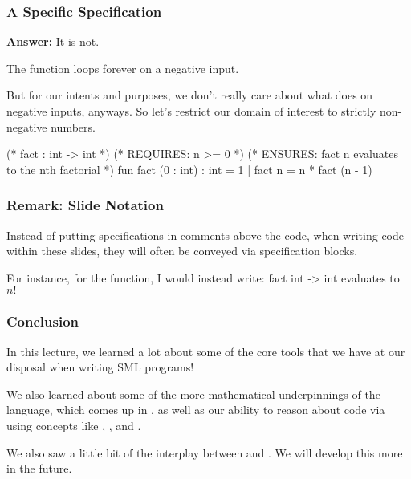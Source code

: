 \documentclass[aspectratio=169, handout]{beamer}
\begin{document}
\begin{frame}[fragile]
  \frametitle{A Specific Specification}

  \textbf{Answer:} It is not.

  \pause
  \vspace{\fill}

  The  function loops forever on a negative input.

  \pause
  \vspace{\fill}

  But for our intents and purposes, we don't really
  care about what  does on negative inputs, anyways. So
  let's restrict our domain of interest to strictly non-negative
  numbers.

  \pause
  \vspace{\fill}

  \begin{codeblock}
    (* fact : int -> int *)
    (* REQUIRES: n >= 0 *)
    (* ENSURES: fact n evaluates to the nth factorial *)
    fun fact (0 : int) : int = 1
      | fact n = n * fact (n - 1)
  \end{codeblock}

  \pause
\end{frame}

\begin{frame}[fragile]
  \frametitle{Remark: Slide Notation}

  Instead of putting specifications in comments above the code, when
  writing code within these slides, they will often be conveyed via
  specification blocks.

  \vspace{\fill}

  For instance, for the  function, I would instead write:
  \spec
    {fact}
    {int -> int}
    {}
    { evaluates to $n!$}
\end{frame}

\begin{frame}[fragile]
  \frametitle{Conclusion}

  In this lecture, we learned a lot about some of the core
  tools that we have at our disposal when writing SML programs!

  \pause
  \vspace{\fill}

  We also learned about some of the more mathematical underpinnings
  of the language, which comes up in ,
  as well as our ability to reason about code via using concepts
  like , , and
  .

  \pause
  \vspace{\fill}

  We also saw a little bit of the interplay between 
  and . We will develop this more in the future.
\end{frame}
\end{document}
